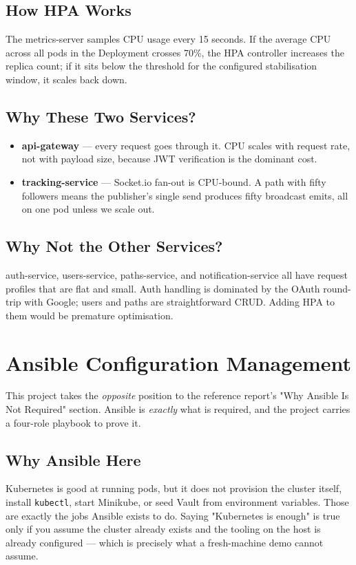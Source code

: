 \documentclass[11pt,a4paper]{article}
\begin{document}
\subsection{How HPA Works}
The metrics-server samples CPU usage every 15 seconds.  If the
average CPU across all pods in the Deployment crosses 70\%, the HPA
controller increases the replica count; if it sits below the
threshold for the configured stabilisation window, it scales back
down.

\subsection{Why These Two Services?}
\begin{itemize}[leftmargin=*]
  \item \textbf{api-gateway} — every request goes through it.  CPU
        scales with request rate, not with payload size, because
        JWT verification is the dominant cost.
  \item \textbf{tracking-service} — Socket.io fan-out is CPU-bound.
        A path with fifty followers means the publisher's single
        send produces fifty broadcast emits, all on one pod unless
        we scale out.
\end{itemize}

\subsection{Why Not the Other Services?}
auth-service, users-service, paths-service, and notification-service
all have request profiles that are flat and small.  Auth handling is
dominated by the OAuth round-trip with Google; users and paths are
straightforward CRUD.  Adding HPA to them would be premature
optimisation.

\section{Ansible Configuration Management}

This project takes the \emph{opposite} position to the reference
report's "Why Ansible Is Not Required" section.  Ansible is
\emph{exactly} what is required, and the project carries a four-role
playbook to prove it.

\subsection{Why Ansible Here}
Kubernetes is good at running pods, but it does not provision the
cluster itself, install \texttt{kubectl}, start Minikube, or seed
Vault from environment variables.  Those are exactly the jobs
Ansible exists to do.  Saying "Kubernetes is enough" is true only if
you assume the cluster already exists and the tooling on the host is
already configured — which is precisely what a fresh-machine demo
cannot assume.
\end{document}
